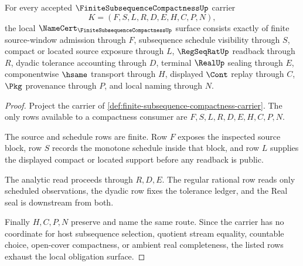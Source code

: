 \begin{theorem}
\label{thm:finite-subsequence-compactness-namecert-obligations}
For every accepted $\FiniteSubsequenceCompactnessUp$ carrier
$$
K=(F,S,L,R,D,E,H,C,P,N),
$$
the local $\NameCert_{\FiniteSubsequenceCompactnessUp}$ surface consists exactly of finite source-window admission through $F$, subsequence schedule visibility through $S$, compact or located source exposure through $L$, $\RegSeqRatUp$ readback through $R$, dyadic tolerance accounting through $D$, terminal $\RealUp$ sealing through $E$, componentwise $\hsame$ transport through $H$, displayed $\Cont$ replay through $C$, $\Pkg$ provenance through $P$, and local naming through $N$.
\end{theorem}
\begin{proof}
Project the carrier of \autoref{def:finite-subsequence-compactness-carrier}. The only rows available to a compactness consumer are $F,S,L,R,D,E,H,C,P,N$.

The source and schedule rows are finite. Row $F$ exposes the inspected source block, row $S$ records the monotone schedule inside that block, and row $L$ supplies the displayed compact or located support before any readback is public.

The analytic read proceeds through $R,D,E$. The regular rational row reads only scheduled observations, the dyadic row fixes the tolerance ledger, and the Real seal is downstream from both.

Finally $H,C,P,N$ preserve and name the same route. Since the carrier has no coordinate for host subsequence selection, quotient stream equality, countable choice, open-cover compactness, or ambient real completeness, the listed rows exhaust the local obligation surface.
\end{proof}

